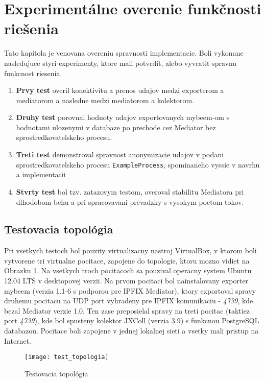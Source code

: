 \section{Experimentálne overenie funkčnosti riešenia}

Tato kapitola je venovana overeniu spravnosti implementacie. Boli vykonane nasledujuce styri experimenty, 
ktore mali potvrdit, alebo vyvratit spravnu funkcnost riesenia. 
\begin{enumerate}
 \item \textbf{Prvy test} overil konektivitu a prenos udajov medzi exporterom a mediatorom a nasledne medzi 
 mediatorom a kolektorom.
 \item \textbf{Druhy test} porovnal hodnoty udajov exportovanych mybeem-om s hodnotami ulozenymi v databaze po prechode
 cez Mediator bez sprostredkovatelskeho procesu.
 \item \textbf{Treti test} demonstroval spravnost anonymizacie udajov v podani sprostredkovatelskeho procesu 
 \verb|ExampleProcess|, spominaneho vyssie v navrhu a implementacii
 \item \textbf{Stvrty test} bol tzv. zatazovym testom, overoval stabilitu Mediatora pri dlhodobom behu a pri 
 spracovavani prevadzky s vysokym poctom tokov.
\end{enumerate}


\subsection{Testovacia topológia}

Pri vsetkych testoch bol pouzity virtualizacny nastroj VirtualBox, v ktorom boli vytvorene tri virtualne 
pocitace, zapojene do topologie, ktoru mozno vidiet na Obrazku \ref{o:test_topologia}.
Na vsetkych troch pocitacoch sa pouzival operacny system Ubuntu 12.04 LTS v desktopovej verzii. Na prvom 
pocitaci bol nainstalovany exporter mybeem (verzia 1.1-6 s podporou pre IPFIX Mediator), ktory exportoval 
spravy druhemu pocitacu na UDP port vyhradeny pre IPFIX komunikaciu - \emph{4739}, kde bezal Mediator
verzie 1.0. Ten zase preposielal spravy na treti pocitac (taktiez port \emph{4739}), kde bol spusteny 
kolektor JXColl (verzia 3.9) s funkcnou PostgreSQL databazou. Pocitace boli zapojene v jednej lokalnej 
sieti a vsetky mali pristup na Internet.

\begin{figure}[ht!]
\centering
\texttt{[image: test\_topologia]}
\caption{Testovacia topológia}\label{o:test_topologia}
\end{figure}


